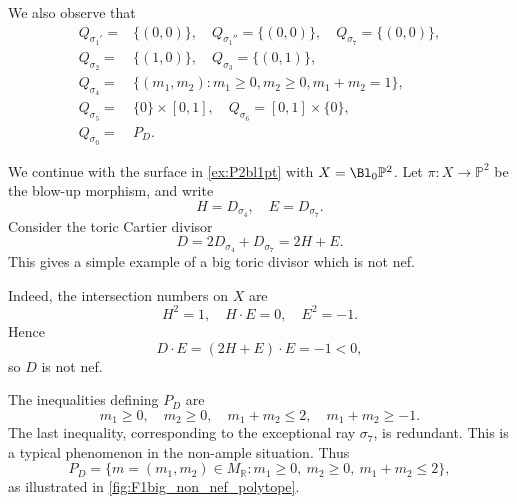 \begin{example}
    We also observe that
    \[
    \begin{aligned}
    Q_{\sigma_1'}=&\{(0,0)\},\quad Q_{\sigma_1''}=\{(0,0)\},\quad Q_{\sigma_7}=\{(0,0)\},\\
    Q_{\sigma_2}=&\{(1,0)\},\quad Q_{\sigma_3}=\{(0,1)\},\\
    Q_{\sigma_4}=& \{(m_1,m_2):m_1\geq 0,m_2\geq 0,m_1+m_2=1\},\\
    Q_{\sigma_5}=& \{0\}\times [0,1],\quad Q_{\sigma_6}= [0,1]\times \{0\},\\
    Q_{\sigma_0}=& P_D.
    \end{aligned}
    \]
\end{example}

\begin{example}\label{ex:F1big_non_nef}
    We continue with the surface in \cref{ex:P2bl1pt} with $X=\Bl_0\mathbb{P}^2$. Let $\pi\colon X\rightarrow \mathbb{P}^2$ be the blow-up morphism, and write
    \[
        H=D_{\sigma_4},\quad E=D_{\sigma_7}.
    \]
    Consider the toric Cartier divisor
    \[
        D=2D_{\sigma_4}+D_{\sigma_7}=2H+E.
    \]
    This gives a simple example of a big toric divisor which is not nef.

    Indeed, the intersection numbers on $X$ are
    \[
    H^2=1,\quad H\cdot E=0,\quad E^2=-1.
    \]
    Hence
    \[
    D\cdot E=(2H+E)\cdot E=-1<0,
    \]
    so $D$ is not nef.

    The inequalities defining $P_D$ are
    \[
    m_1\geq 0,\quad m_2\geq 0,\quad m_1+m_2\leq 2,\quad m_1+m_2\geq -1.
    \]
    The last inequality, corresponding to the exceptional ray $\sigma_7$, is redundant. This is a typical phenomenon in the non-ample situation.
    Thus
    \[
    P_D=\{m=(m_1,m_2)\in M_{\mathbb{R}}:m_1\geq 0,\ m_2\geq 0,\ m_1+m_2\leq 2\},
    \]
    as illustrated in \cref{fig:F1big_non_nef_polytope}.
    \begin{figure}[ht]
        \centering
\end{figure}
\end{example}
